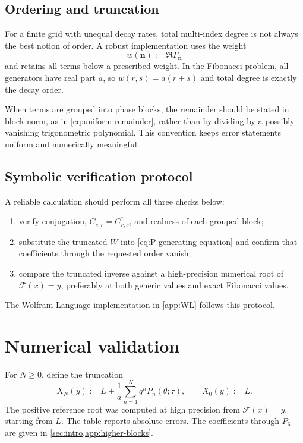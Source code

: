 \documentclass[11pt,oneside]{article}
\numberwithin{equation}{section}
\newcommand{\cF}{\mathcal{F}}
\newcommand{\vct}[1]{\boldsymbol{#1}}
\begin{document}
\subsection{Ordering and truncation}

For a finite grid with unequal decay rates, total multi-index degree is not
always the best notion of order.  A robust implementation uses the weight
\begin{equation}
  w(\vct n):=\Re\Gamma_{\vct n}
  \label{eq:weight-order}
\end{equation}
and retains all terms below a prescribed weight.  In the Fibonacci problem,
all generators have real part \(a\), so
\(w(r,s)=a(r+s)\) and total degree is exactly the decay order.

When terms are grouped into phase blocks, the remainder should be stated in
block norm, as in \cref{eq:uniform-remainder}, rather than by dividing by a
possibly vanishing trigonometric polynomial.  This convention keeps error
statements uniform and numerically meaningful.

\subsection{Symbolic verification protocol}

A reliable calculation should perform all three checks below:
\begin{enumerate}
  \item verify conjugation, \(C_{s,r}=\overline{C_{r,s}}\), and realness of each
        grouped block;
  \item substitute the truncated \(W\) into
        \cref{eq:P-generating-equation} and confirm that coefficients through
        the requested order vanish;
  \item compare the truncated inverse against a high-precision numerical root
        of \(\cF(x)=y\), preferably at both generic values and exact Fibonacci
        values.
\end{enumerate}
The Wolfram Language implementation in \cref{app:WL} follows this protocol.

\section{Numerical validation}
\label{sec:numerics}

For \(N\ge0\), define the truncation
\begin{equation}
  X_N(y):=L+\frac1a\sum_{n=1}^{N}q^nP_n(\theta;\tau),
  \qquad X_0(y):=L.
  \label{eq:XN-def}
\end{equation}
The positive reference root was computed at high precision from
\(\cF(x)=y\), starting from \(L\).  The table reports absolute errors.
The coefficients through \(P_6\) are given in
\cref{sec:intro,app:higher-blocks}.
\end{document}

